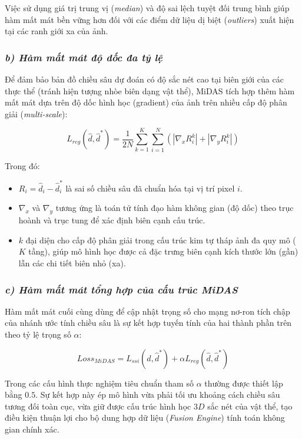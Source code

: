 Việc sử dụng giá trị trung vị (\textit{median}) và độ sai lệch tuyệt đối trung bình giúp hàm mất mát bền vững hơn đối với các điểm dữ liệu dị biệt (\textit{outliers}) xuất hiện tại các ranh giới xa của ảnh.

\subsubsection*{\textit{b) Hàm mất mát độ dốc đa tỷ lệ}}
Để đảm bảo bản đồ chiều sâu dự đoán có độ sắc nét cao tại biên giới của các thực thể (tránh hiện tượng nhòe biên dạng vật thể), MiDAS tích hợp thêm hàm mất mát dựa trên độ dốc hình học (gradient) của ảnh trên nhiều cấp độ phân giải (\textit{multi-scale}):

\begin{equation}
    L_{reg}(\hat{d}, \hat{d}^*) = \frac{1}{2N} \sum_{k=1}^{K} \sum_{i=1}^{N} \left( \left| \nabla_x R_i^k \right| + \left| \nabla_y R_i^k \right| \right)
\end{equation}

Trong đó:
\begin{itemize}
    \item $R_i = \hat{d}_i - \hat{d}^*_i$ là sai số chiều sâu đã chuẩn hóa tại vị trí pixel $i$.
    \item $\nabla_x$ và $\nabla_y$ tương ứng là toán tử tính đạo hàm không gian (độ dốc) theo trục hoành và trục tung để xác định biên cạnh cấu trúc.
    \item $k$ đại diện cho cấp độ phân giải trong cấu trúc kim tự tháp ảnh đa quy mô ($K$ tầng), giúp mô hình học được cả đặc trưng biên cạnh kích thước lớn (gần) lẫn các chi tiết biên nhỏ (xa).
\end{itemize}

\subsubsection*{\textit{c) Hàm mất mát tổng hợp của cấu trúc MiDAS}}
Hàm mất mát cuối cùng dùng để cập nhật trọng số cho mạng nơ-ron tích chập của nhánh ước tính chiều sâu là sự kết hợp tuyến tính của hai thành phần trên theo tỷ lệ trọng số $\alpha$:

\begin{equation}
    Loss_{MiDAS} = L_{ssi}(\hat{d}, \hat{d}^*) + \alpha L_{reg}(\hat{d}, \hat{d}^*)
\end{equation}

Trong các cấu hình thực nghiệm tiêu chuẩn tham số $\alpha$ thường được thiết lập bằng $0.5$. Sự kết hợp này ép mô hình vừa phải tối ưu khoảng cách chiều sâu tương đối toàn cục, vừa giữ được cấu trúc hình học $3D$ sắc nét của vật thể, tạo điều kiện thuận lợi cho bộ dung hợp dữ liệu (\textit{Fusion Engine}) tính toán không gian chính xác.


